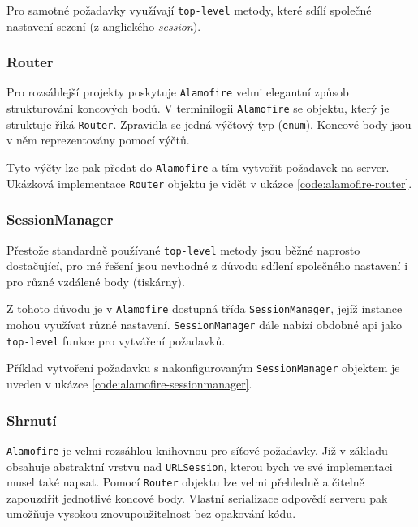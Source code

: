 Pro samotné požadavky využívají \texttt{top-level} metody, které sdílí společné nastavení sezení (z anglického \textit{session}).

\subsubsection*{Router}

Pro rozsáhlejší projekty poskytuje \texttt{Alamofire} velmi elegantní způsob strukturování koncových bodů.
V terminilogii \texttt{Alamofire} se objektu, který je struktuje říká \texttt{Router}.
Zpravidla se jedná výčtový typ (\texttt{enum}).
Koncové body jsou v něm reprezentovány pomocí výčtů.

Tyto výčty lze pak předat do \texttt{Alamofire} a tím vytvořit požadavek na server.
Ukázková implementace \texttt{Router} objektu je vidět v ukázce \ref{code:alamofire-router}.


\subsubsection*{SessionManager}

Přestože standardně používané \texttt{top-level} metody jsou běžné naprosto dostačující, pro mé řešení jsou nevhodné z důvodu sdílení společného nastavení i pro různé vzdálené body (tiskárny).

Z tohoto důvodu je v \texttt{Alamofire} dostupná třída \texttt{SessionManager}, jejíž instance mohou využívat různé nastavení.
\texttt{SessionManager} dále nabízí obdobné \acrshort{api} jako \texttt{top-level} funkce pro vytváření požadavků.

Příklad vytvoření požadavku s nakonfigurovaným \texttt{SessionManager} objektem je uveden v ukázce \ref{code:alamofire-sessionmanager}.


\subsubsection*{Shrnutí}

\texttt{Alamofire} je velmi rozsáhlou knihovnou pro síťové požadavky.
Již v základu obsahuje abstraktní vrstvu nad \texttt{URLSession}, kterou bych ve své implementaci musel také napsat.
Pomocí \texttt{Router} objektu lze velmi přehledně a čitelně zapouzdřit jednotlivé koncové body.
Vlastní serializace odpovědí serveru pak umožňuje vysokou znovupoužitelnost bez opakování kódu.

